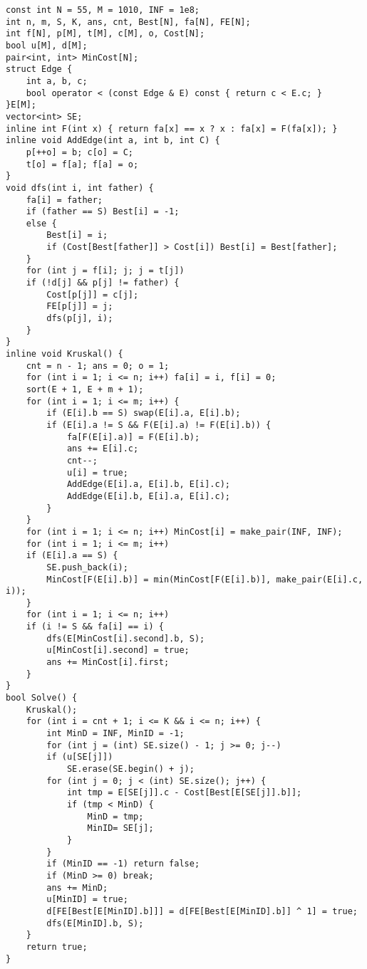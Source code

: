 \begin{lstlisting}
const int N = 55, M = 1010, INF = 1e8;
int n, m, S, K, ans, cnt, Best[N], fa[N], FE[N];
int f[N], p[M], t[M], c[M], o, Cost[N];
bool u[M], d[M];
pair<int, int> MinCost[N];
struct Edge {
	int a, b, c;
	bool operator < (const Edge & E) const { return c < E.c; }
}E[M];
vector<int> SE;
inline int F(int x) { return fa[x] == x ? x : fa[x] = F(fa[x]); }
inline void AddEdge(int a, int b, int C) {
	p[++o] = b; c[o] = C;
	t[o] = f[a]; f[a] = o;
}
void dfs(int i, int father) {
	fa[i] = father;
	if (father == S) Best[i] = -1;
	else {
		Best[i] = i;
		if (Cost[Best[father]] > Cost[i]) Best[i] = Best[father];
	}
	for (int j = f[i]; j; j = t[j])
	if (!d[j] && p[j] != father) {
		Cost[p[j]] = c[j];
		FE[p[j]] = j;
		dfs(p[j], i);
	}
}
inline void Kruskal() {
	cnt = n - 1; ans = 0; o = 1;
	for (int i = 1; i <= n; i++) fa[i] = i, f[i] = 0;
	sort(E + 1, E + m + 1);
	for (int i = 1; i <= m; i++) {
		if (E[i].b == S) swap(E[i].a, E[i].b);
		if (E[i].a != S && F(E[i].a) != F(E[i].b)) {
			fa[F(E[i].a)] = F(E[i].b);
			ans += E[i].c;
			cnt--;
			u[i] = true;
			AddEdge(E[i].a, E[i].b, E[i].c);
			AddEdge(E[i].b, E[i].a, E[i].c);
		}
	}
	for (int i = 1; i <= n; i++) MinCost[i] = make_pair(INF, INF);
	for (int i = 1; i <= m; i++)
	if (E[i].a == S) {
		SE.push_back(i);
		MinCost[F(E[i].b)] = min(MinCost[F(E[i].b)], make_pair(E[i].c, i));
	}
	for (int i = 1; i <= n; i++)
	if (i != S && fa[i] == i) {
		dfs(E[MinCost[i].second].b, S);
		u[MinCost[i].second] = true;
		ans += MinCost[i].first;
	}
}
bool Solve() {
	Kruskal();
	for (int i = cnt + 1; i <= K && i <= n; i++) {
		int MinD = INF, MinID = -1;
		for (int j = (int) SE.size() - 1; j >= 0; j--)
		if (u[SE[j]])
			SE.erase(SE.begin() + j);
		for (int j = 0; j < (int) SE.size(); j++) {
			int tmp = E[SE[j]].c - Cost[Best[E[SE[j]].b]];
			if (tmp < MinD) {
				MinD = tmp;
				MinID= SE[j];
			}
		}
		if (MinID == -1) return false;
		if (MinD >= 0) break;
		ans += MinD;
		u[MinID] = true;
		d[FE[Best[E[MinID].b]]] = d[FE[Best[E[MinID].b]] ^ 1] = true;
		dfs(E[MinID].b, S);
	}
	return true;
}
\end{lstlisting}
